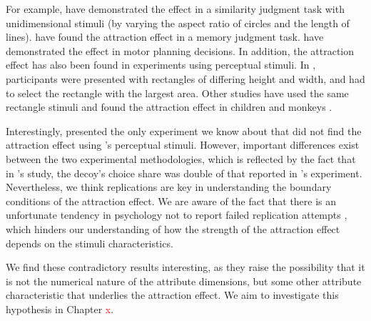 \documentclass[11pt,a4paper]{article}
\begin{document}
For example,  have demonstrated the effect in a similarity judgment task with unidimensional stimuli (by varying the aspect ratio of circles and the length of lines).  have found the attraction effect in a memory judgment task.   have demonstrated the effect in motor planning decisions. In addition, the attraction effect has also been found in experiments using perceptual stimuli. In \citeauthor{Trueblood2013}, participants were presented with rectangles of differing height and width, and had to select the rectangle with the largest area. Other studies have used the same rectangle stimuli and found the attraction effect in children \cite{Zhen2016} and monkeys \cite{Parrish2015}.

 Interestingly, \citeauthor{Frederick2014} presented the only experiment we know about that did not find the attraction effect using 's perceptual stimuli. However, important differences exist between the two experimental methodologies, which is reflected by the fact that in \citeauthor{Frederick2014}'s study, the decoy's choice share was double of that reported in \citeauthor{Trueblood2013}'s experiment. Nevertheless, we think replications are key in understanding the boundary conditions of the attraction effect. We are aware of the fact that there is an unfortunate tendency in psychology not to report failed replication attempts \cite{Ingre2015}, which hinders our understanding of how the strength of the attraction effect depends on the stimuli characteristics.

We find these contradictory results interesting, as they raise the possibility that it is not the numerical nature of the attribute dimensions, but some other attribute characteristic that underlies the attraction effect. We aim to investigate this hypothesis in Chapter \textcolor{red}{x}.














\newpage


\end{document}
